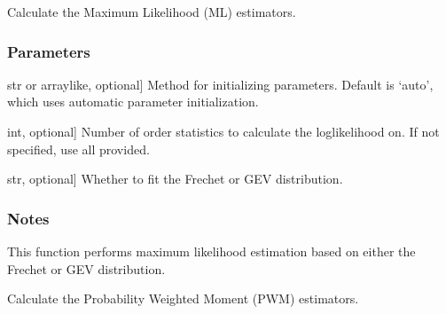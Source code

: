 \documentclass[a4paper,11pt,openany,english]{sphinxmanual}
\begin{document}
\begin{fulllineitems}
\begin{fulllineitems}
\label{\detokenize{api_topt:xtremes.topt.HighOrderStats.get_ML_estimation}}
\pysigstartsignatures
{}
\pysigstopsignatures
\sphinxAtStartPar
Calculate the Maximum Likelihood (ML) estimators.


\subsubsection{Parameters}
\label{\detokenize{api_topt:id10}}\begin{description}
\sphinxlineitem{initParams}{[}str or array\sphinxhyphen{}like, optional{]}
\sphinxAtStartPar
Method for initializing parameters. Default is ‘auto’, which uses automatic parameter initialization.

\sphinxlineitem{r}{[}int, optional{]}
\sphinxAtStartPar
Number of order statistics to calculate the log\sphinxhyphen{}likelihood on. If not specified, use all provided.

\sphinxlineitem{FrechetOrGEV}{[}str, optional{]}
\sphinxAtStartPar
Whether to fit the Frechet or GEV distribution.

\end{description}


\subsubsection{Notes}
\label{\detokenize{api_topt:id11}}
\sphinxAtStartPar
This function performs maximum likelihood estimation based on either the Frechet or GEV distribution.

\end{fulllineitems}


\begin{fulllineitems}
\label{\detokenize{api_topt:xtremes.topt.HighOrderStats.get_PWM_estimation}}
\pysigstartsignatures
{}
\pysigstopsignatures
\sphinxAtStartPar
Calculate the Probability Weighted Moment (PWM) estimators.

\end{fulllineitems}


\end{fulllineitems}
\end{document}
